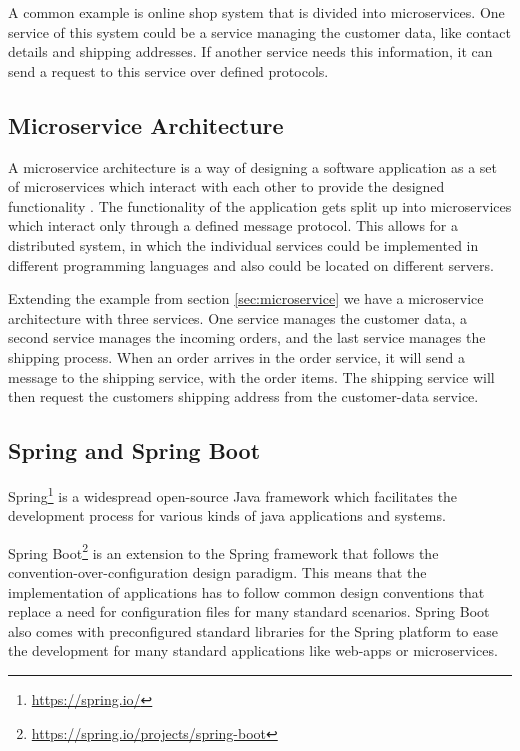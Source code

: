 A common example is online shop system that is divided into microservices.
One service of this system could be a service managing the customer data, like contact details and shipping addresses.
If another service needs this information, it can send a request to this service over defined protocols.


\subsection{Microservice Architecture}
\label{sec:microservice_architecture}
A microservice architecture is a way of designing a software application as a set of microservices which interact with each other to provide the designed functionality \cite{dragoniMicroservicesYesterdayToday2017, MicroservicesHttpsMartinfowler}.
The functionality of the application gets split up into microservices which interact only through a defined message protocol.
This allows for a distributed system, in which the individual services could be implemented in different programming languages and also could be located on different servers.

Extending the example from section \ref{sec:microservice} we have a microservice architecture with three services.
One service manages the customer data, a second service manages the incoming orders, and the last service manages the shipping process.
When an order arrives in the order service, it will send a message to the shipping service, with the order items.
The shipping service will then request the customers shipping address from the customer-data service.


\subsection{Spring and Spring Boot}
\label{sec:spring}
Spring\footnote{\url{https://spring.io/}} is a widespread open-source Java framework which facilitates the development process for various kinds of java applications and systems.

Spring Boot\footnote{\url{https://spring.io/projects/spring-boot}} is an extension to the Spring framework that follows the convention-over-configuration design paradigm.
This means that the implementation of applications has to follow common design conventions that replace a need for configuration files for many standard scenarios.
Spring Boot also comes with preconfigured standard libraries for the Spring platform to ease the development for many standard applications like web-apps or microservices.

